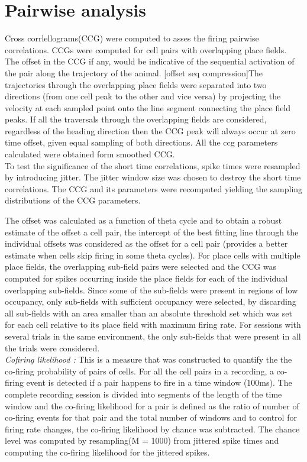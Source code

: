 \section{Pairwise analysis}
Cross corrlellograms(CCG) were computed to asses the firing pairwise correlations. CCGs were computed for cell pairs with overlapping place fields. The offset in the CCG if any, would be indicative of the sequential activation of the pair along the trajectory of the animal. [offset seq compression]The trajectories through the overlapping place fields were separated into two directions (from one cell peak to the other and vice versa) by projecting the velocity at each sampled point onto the line segment connecting the place field peaks. If all the traversals through the overlapping fields are considered, regardless of the heading direction then the CCG peak will always occur at zero time offset, given equal sampling of both directions. All the ccg parameters calculated were obtained form smoothed CCG. \\
To test the significance of the short time correlations, spike times were resampled by introducing jitter. The jitter window size was chosen to destroy the short time correlations. The CCG and its parameters were recomputed yielding the sampling distributions of the CCG parameters.

The offset was calculated as a function of theta cycle and to obtain a robust estimate of the offset a cell pair, the intercept of the best fitting line through the individual offsets was considered as the offset for a cell pair (provides a better estimate when cells skip firing in some theta cycles). For place cells with multiple place fields, the overlapping sub-field pairs were selected and the CCG was computed for spikes occurring inside the place fields for each of the individual overlapping sub-fields. Since some of the sub-fields were present in regions of low occupancy, only sub-fields with sufficient occupancy were selected, by discarding all sub-fields with an area smaller than an absolute threshold set which was set for each cell relative to its place field with maximum firing rate. For sessions with several trials in the same environment, the only sub-fields that were present in all the trials were considered. \\ %

\emph{Cofiring likelihood : } This is a measure that was constructed to quantify the the co-firing probability of pairs of cells. For all the cell pairs in a recording, a co-firing event is detected if a pair happens to fire in a time window (100ms). The complete recording session is divided into segments of the length of the time window and the co-firing likelihood for a pair is defined as the ratio of number of co-firing events for that pair and the total number of windows and to control for firing rate changes, the co-firing likelihood by chance was subtracted. The chance level was computed by resampling(M = 1000) from jittered spike times and computing the co-firing likelihood for the jittered spikes.

